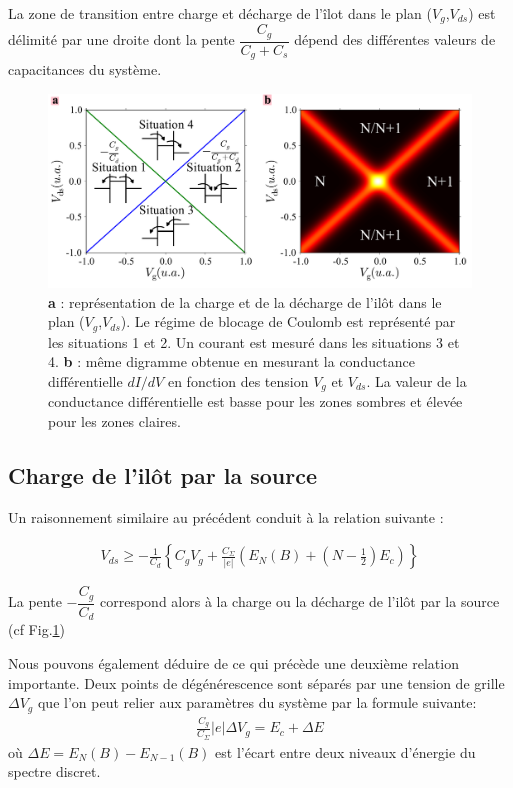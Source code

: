 La zone de transition entre charge et décharge de l'\^ilot dans le plan ($V_g$,$V_{ds}$) est délimité par une droite dont la pente $\dfrac{C_g}{C_g + C_s}$ dépend des différentes valeurs de capacitances du système.


\begin{figure}
\includegraphics[scale=0.45]{Annexe2/figure3/figure3.pdf} 
\caption{\textbf{a} : représentation de la charge et de la décharge de l'il\^ot dans le plan ($V_g$,$V_{ds}$). Le régime de blocage de Coulomb est représenté par les situations 1 et 2. Un courant est mesuré dans les situations 3 et 4. \textbf{b} : m\^eme digramme obtenue en mesurant la conductance différentielle $dI/dV$ en fonction des tension $V_g$ et $V_{ds}$. La valeur de la conductance différentielle est basse pour les zones sombres et élevée pour les zones claires.}
\label{charge_discharge}
\end{figure}



\subsection{Charge de l'il\^ot par la source}
Un raisonnement similaire au précédent conduit à la relation suivante :

\begin{eqnarray}
V_{ds} \geq -\frac{1}{C_d} \left\lbrace C_gV_g + \frac{C_{\Sigma}}{|e|}\left( E_N(B) + (N-\frac{1}{2})E_c \right) \right\rbrace
\end{eqnarray}


La pente $-\dfrac{C_g}{C_d}$ correspond alors à la charge ou la décharge de l'il\^ot par la source (cf Fig.\ref{charge_discharge})

Nous pouvons également déduire de ce qui précède une deuxième relation importante. Deux points de dégénérescence sont séparés par une tension de grille $\Delta V_g$ que l'on peut relier aux paramètres du système par la formule suivante:
\begin{eqnarray}
\frac{C_g}{C_{\Sigma}} |e| \Delta V_g = E_c + \Delta E
\end{eqnarray}
où $\Delta E = E_N(B) - E_{N-1}(B)$ est l'écart entre deux niveaux d'énergie du spectre discret.



